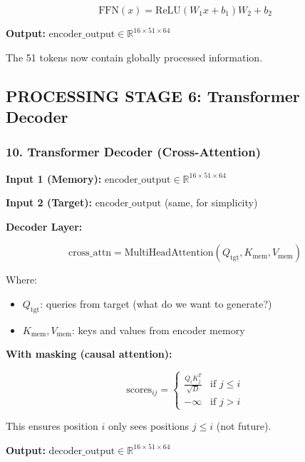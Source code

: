 \documentclass[11pt,a4paper]{article}
\begin{document}
\begin{equation}
\text{FFN}(x) = \text{ReLU}(W_1 x + b_1) W_2 + b_2
\end{equation}

\textbf{Output:} $\text{encoder\_output} \in \mathbb{R}^{16 \times 51 \times 64}$

The 51 tokens now contain globally processed information.

\subsection{PROCESSING STAGE 6: Transformer Decoder}

\subsubsection{10. Transformer Decoder (Cross-Attention)}

\textbf{Input 1 (Memory):} $\text{encoder\_output} \in \mathbb{R}^{16 \times 51 \times 64}$

\textbf{Input 2 (Target):} $\text{encoder\_output}$ (same, for simplicity)

\textbf{Decoder Layer:}

\begin{equation}
\text{cross\_attn} = \text{MultiHeadAttention}(Q_{\text{tgt}}, K_{\text{mem}}, V_{\text{mem}})
\end{equation}

Where:
\begin{itemize}
  \item $Q_{\text{tgt}}$: queries from target (what do we want to generate?)
  \item $K_{\text{mem}}, V_{\text{mem}}$: keys and values from encoder memory
\end{itemize}

\textbf{With masking (causal attention):}

\begin{equation}
\text{scores}_{ij} = \begin{cases}
\frac{Q_i K_j^T}{\sqrt{D}} & \text{if } j \leq i \\
-\infty & \text{if } j > i
\end{cases}
\end{equation}

This ensures position $i$ only sees positions $j \leq i$ (not future).

\textbf{Output:} $\text{decoder\_output} \in \mathbb{R}^{16 \times 51 \times 64}$
\end{document}
